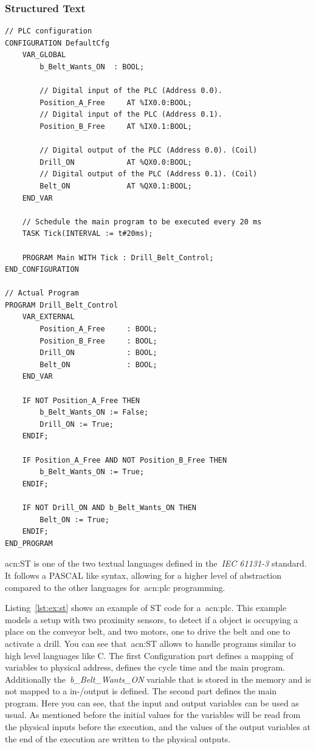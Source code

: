 \subsubsection{Structured Text}
\lstset{language=Pascal}
\begin{lstlisting}[caption={
Example of~\gls{acn:ST} code for controlling a converyor belt and a drill.},label=lst:ex:st]
// PLC configuration
CONFIGURATION DefaultCfg
	VAR_GLOBAL
		b_Belt_Wants_ON  : BOOL;

		// Digital input of the PLC (Address 0.0).
		Position_A_Free     AT %IX0.0:BOOL;
		// Digital input of the PLC (Address 0.1).
		Position_B_Free     AT %IX0.1:BOOL;

		// Digital output of the PLC (Address 0.0). (Coil)
		Drill_ON            AT %QX0.0:BOOL;
		// Digital output of the PLC (Address 0.1). (Coil)
		Belt_ON             AT %QX0.1:BOOL;
	END_VAR

	// Schedule the main program to be executed every 20 ms
	TASK Tick(INTERVAL := t#20ms);

	PROGRAM Main WITH Tick : Drill_Belt_Control;
END_CONFIGURATION

// Actual Program
PROGRAM Drill_Belt_Control          
	VAR_EXTERNAL
		Position_A_Free     : BOOL;
		Position_B_Free     : BOOL;
		Drill_ON            : BOOL;
		Belt_ON             : BOOL;
	END_VAR

	IF NOT Position_A_Free THEN
		b_Belt_Wants_ON := False;
		Drill_ON := True;
	ENDIF;

	IF Position_A_Free AND NOT Position_B_Free THEN
		b_Belt_Wants_ON := True;
	ENDIF;

	IF NOT Drill_ON AND b_Belt_Wants_ON THEN
		Belt_ON := True;
	ENDIF;
END_PROGRAM
\end{lstlisting}

\acrfull{acn:ST} is one of the two textual languages defined in the~\textit{IEC 61131-3} standard.
It follows a PASCAL like syntax, allowing for a higher level of abstraction compared to the other languages for~\acrshort{acn:plc} programming.

Listing~\ref{lst:ex:st} shows an example of ST code for a~\acrshort{acn:plc}.
This example models a setup with two proximity sensors, to detect if a object is occupying a place on the conveyor belt, and two motors, one to drive the belt and one to activate a drill.
You can see that~\acrshort{acn:ST} allows to handle programs similar to high level languages like C.
The first Configuration part defines a mapping of variables to physical address, defines the cycle time and the main program.
Additionally the~\textit{b\_Belt\_Wants\_ON} variable that is stored in the memory and is not mapped to a in-/output is defined.
The second part defines the main program.
Here you can see, that the input and output variables can be used as usual.
As mentioned before the initial values for the variables will be read from the physical inputs before the execution, and the values of the output variables at the end of the execution are written to the physical outputs.

